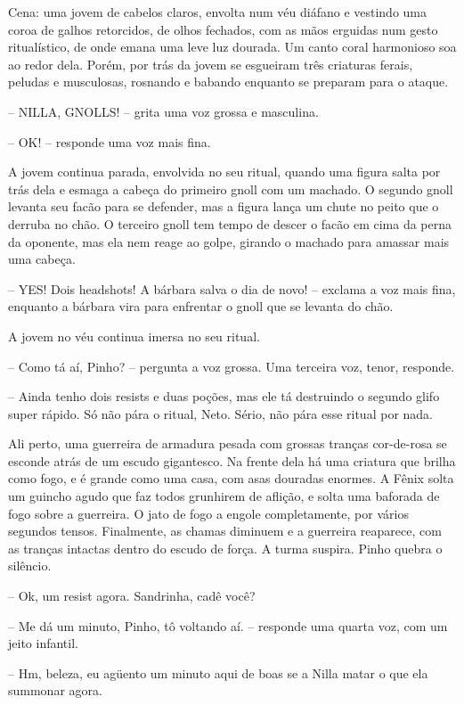 

Cena: uma jovem de cabelos claros, envolta num véu diáfano e vestindo uma coroa de galhos retorcidos,
de olhos fechados, com as mãos erguidas num gesto ritualístico, de onde emana uma leve luz dourada.
Um canto coral harmonioso soa ao redor dela. Porém, por trás da jovem se esgueiram três criaturas
ferais, peludas e musculosas, rosnando e babando enquanto se preparam para o ataque.

-- NILLA, GNOLLS! -- grita uma voz grossa e masculina.

-- OK! -- responde uma voz mais fina.

A jovem continua parada, envolvida no seu ritual, quando uma figura salta por trás dela e esmaga a cabeça do primeiro gnoll
com um machado. O segundo gnoll levanta seu facão para se defender, mas a figura lança um chute no peito que o derruba no chão.
O terceiro gnoll tem tempo de descer o facão em cima da perna da oponente, mas ela nem reage ao golpe, girando o machado para
amassar mais uma cabeça. 

-- YES! Dois headshots! A bárbara salva o dia de novo! -- exclama a voz mais fina, enquanto a bárbara vira para enfrentar o gnoll que se levanta do chão.

A jovem no véu continua imersa no seu ritual.

-- Como tá aí, Pinho? -- pergunta a voz grossa. Uma terceira voz, tenor, responde.

-- Ainda tenho dois resists e duas poções, mas ele tá destruindo o segundo glifo super rápido. 
Só não pára o ritual, Neto. Sério, não pára esse ritual por nada.

Ali perto, uma guerreira de armadura pesada com grossas tranças cor-de-rosa se esconde atrás de um escudo gigantesco. 
Na frente dela há uma criatura que brilha como fogo, e é grande como uma casa, com asas douradas enormes.
A Fênix solta um guincho agudo que faz todos grunhirem de aflição, e solta uma baforada de fogo sobre a guerreira.
O jato de fogo a engole completamente, por vários segundos tensos. Finalmente, as chamas diminuem e a guerreira reaparece,
com as tranças intactas dentro do escudo de força. A turma suspira. Pinho quebra o silêncio.

-- Ok, um resist agora. Sandrinha, cadê você?

-- Me dá um minuto, Pinho, tô voltando aí. -- responde uma quarta voz, com um jeito infantil.

-- Hm, beleza, eu agüento um minuto aqui de boas se a Nilla matar o que ela summonar agora.

